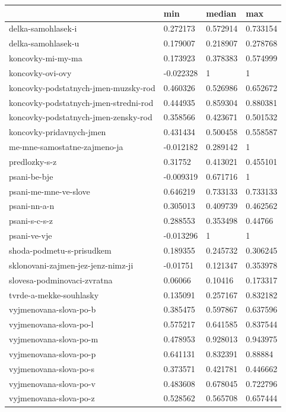 \documentclass[
  digital, %
  table,   %
  nolof,     %
  nolot,     %
  nocover
]{fithesis3}
\begin{document}
\begin{center}
  \begin{tabular}{ | l | l | l | l | }
    \hline
  	 & min & median & max \\ \hline
  	delka-samohlasek-i & 0.272173 & 0.572914 & 0.733154 \\ \hline
  	delka-samohlasek-u & 0.179007 & 0.218907 & 0.278768 \\ \hline
  	koncovky-mi-my-ma & 0.173923 & 0.378383 & 0.574999 \\ \hline
  	koncovky-ovi-ovy & -0.022328 & 1 & 1 \\ \hline
  	koncovky-podstatnych-jmen-muzsky-rod & 0.460326 & 0.526986 & 0.652672 \\ \hline
  	koncovky-podstatnych-jmen-stredni-rod & 0.444935 & 0.859304 & 0.880381 \\ \hline
  	koncovky-podstatnych-jmen-zensky-rod & 0.358566 & 0.423671 & 0.501532 \\ \hline
  	koncovky-pridavnych-jmen & 0.431434 & 0.500458 & 0.558587 \\ \hline
  	me-mne-samostatne-zajmeno-ja & -0.012182 & 0.289142 & 1 \\ \hline
  	predlozky-s-z & 0.31752 & 0.413021 & 0.455101 \\ \hline
  	psani-be-bje & -0.009319 & 0.671716 & 1 \\ \hline
  	psani-me-mne-ve-slove & 0.646219 & 0.733133 & 0.733133 \\ \hline
  	psani-nn-a-n & 0.305013 & 0.409739 & 0.462562 \\ \hline
  	psani-s-c-s-z & 0.288553 & 0.353498 & 0.44766 \\ \hline
  	psani-ve-vje & -0.013296 & 1 & 1 \\ \hline
  	shoda-podmetu-s-prisudkem & 0.189355 & 0.245732 & 0.306245 \\ \hline
  	sklonovani-zajmen-jez-jenz-nimz-ji & -0.01751 & 0.121347 & 0.353978 \\ \hline
  	slovesa-podminovaci-zvratna & 0.06066 & 0.10416 & 0.173317 \\ \hline
  	tvrde-a-mekke-souhlasky & 0.135091 & 0.257167 & 0.832182 \\ \hline
  	vyjmenovana-slova-po-b & 0.385475 & 0.597867 & 0.637596 \\ \hline
  	vyjmenovana-slova-po-l & 0.575217 & 0.641585 & 0.837544 \\ \hline
  	vyjmenovana-slova-po-m & 0.478953 & 0.928013 & 0.943975 \\ \hline
  	vyjmenovana-slova-po-p & 0.641131 & 0.832391 & 0.88884 \\ \hline
  	vyjmenovana-slova-po-s & 0.373571 & 0.421781 & 0.446662 \\ \hline
  	vyjmenovana-slova-po-v & 0.483608 & 0.678045 & 0.722796 \\ \hline
  	vyjmenovana-slova-po-z & 0.528562 & 0.565708 & 0.657444 \\ \hline
  \end{tabular}
\end{center}
\end{document}
